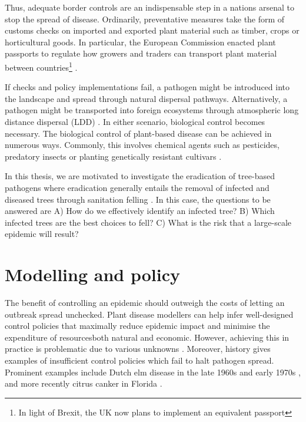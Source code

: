 Thus, adequate border controls are an indispensable step in a nations arsenal to stop the spread of disease.
Ordinarily, preventative measures take the form of customs checks on imported and exported plant material such
as timber, crops or horticultural goods. In particular, the European Commission enacted plant passports to regulate
how growers and traders can transport plant material between countries\footnote{In light of Brexit, the UK now plans
to implement an equivalent passport} \cite{wulfert2010implementation}.

If checks and policy implementations fail, a pathogen might be introduced into the landscape and spread through natural
dispersal pathways. Alternatively, a pathogen might be transported into foreign ecosystems through atmospheric 
long distance dispersal (LDD) \cite{brown2002aerial}. In either scenario, biological control becomes necessary. 
The biological control of plant-based disease
can be achieved in numerous ways. Commonly, this involves chemical agents such as pesticides, predatory insects or planting
genetically resistant cultivars \cite{pal2006biological, baker1974biological}. 

In this thesis, we are motivated to investigate the eradication of tree-based pathogens 
where eradication generally entails the removal of infected and diseased trees through sanitation felling \cite{pietzsch2021effect}. 
In this case, the questions to be answered are A) How do we effectively identify an infected tree? B) 
Which infected trees are the best choices to fell? C) What is the risk that a large-scale epidemic will result?


\section{Modelling and policy}


The benefit of controlling an epidemic should outweigh the costs of letting an outbreak spread unchecked. 
Plant disease modellers can help infer well-designed control policies that maximally reduce epidemic impact and minimise the expenditure
of resources\textemdash both natural and economic. However, achieving this in practice is problematic due to various unknowns \cite{13-challenges}.
Moreover, history gives examples of insufficient control policies which fail to halt pathogen spread. 
Prominent examples include Dutch elm disease in the late 1960s and early 1970s \cite{dutch-elm-mismanage}, 
and more recently citrus canker in Florida \cite{schubert2001meeting}.

